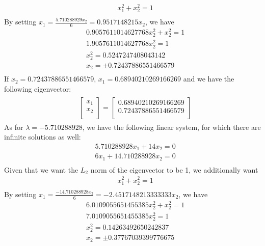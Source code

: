 \documentclass[leqno]{article}
\begin{document}
\begin{equation*}
\begin{split}
&x_1^2 + x_2^2 = 1\\  
\end{split}
\end{equation*}
By setting $x_1 = \frac{5.710288929x_2}{6} = 0.9517148215x_2$, we have
\begin{equation*}
\begin{split}
& 0.9057611014627768x_2^2+ x_2^2 = 1\\
& 1.9057611014627768x_2^2 = 1\\
& x_2^2 = 0.5247247408043142\\
& x_2 = \pm 0.72437886551466579\\  
\end{split}
\end{equation*}
If $x_2 = 0.72437886551466579$, $x_1 = 0.68940210269166269$ and we have the following eigenvector:
\begin{gather*}
\begin{split}
&\begin{bmatrix}
    x_1 \\
    x_2  \\
\end{bmatrix} =
\begin{bmatrix} 
   0.68940210269166269\\
   0.72437886551466579\\
\end{bmatrix}
\end{split}
\end{gather*}
As for $\lambda = -5.710288928$, we have the following linear system, for which there are infinite solutions
as well:
\begin{equation*}
\begin{split}
&5.710288928x_1 + 14x_2 = 0\\
&6x_1 + 14.710288928x_2 = 0\\  
\end{split}
\end{equation*}
Given that we want the $L_2$ norm of the eigenvector to be 1, we additionally want
\begin{equation*}
\begin{split}
&x_1^2 + x_2^2 = 1\\  
\end{split}
\end{equation*}
By setting $x_1 = \frac{-14.710288928x_2}{6} = -2.4517148213333333x_2$, we have
\begin{equation*}
\begin{split}
& 6.0109055651455385x_2^2+ x_2^2 = 1\\
& 7.0109055651455385x_2^2 = 1\\
& x_2^2 = 0.14263492650242837\\
& x_2 = \pm 0.37767039399776675\\  
\end{split}
\end{equation*}
\end{document}
